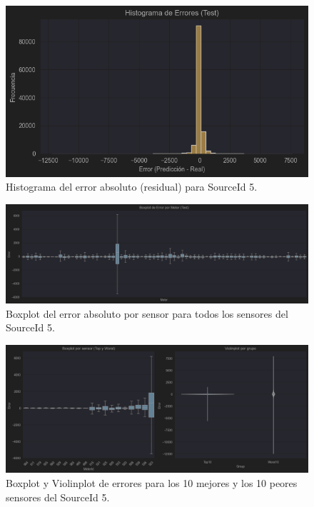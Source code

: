 \begin{figure}[H]
	\centering
	\includegraphics[width=0.75\linewidth]{includes/cap5/graphs/advanced/sid5_error_histogram_predicted_vs_actual.png}
	\caption{Histograma del error absoluto (residual) para SourceId 5.}
	\label{fig:sid5_histograma_error}
\end{figure}

\begin{figure}[H]
	\centering
	\includegraphics[width=0.75\linewidth]{includes/cap5/graphs/advanced/sid5_all_meters_error_boxplot.png}
	\caption{Boxplot del error absoluto por sensor para todos los sensores del SourceId 5.}
	\label{fig:sid5_boxplot_all}
\end{figure}

\begin{figure}[H]
	\centering
	\includegraphics[width=0.75\linewidth]{includes/cap5/graphs/advanced/sid5_10best_10worst_meter_boxplot_violinplot.png}
	\caption{Boxplot y Violinplot de errores para los 10 mejores y los 10 peores sensores del SourceId 5.}
	\label{fig:sid5_violinplot_best_worst}
\end{figure}

